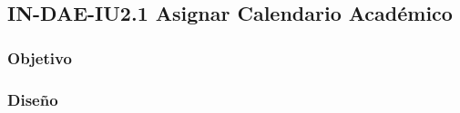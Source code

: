 \subsection{IN-DAE-IU2.1 Asignar Calendario Académico }

	\subsubsection{Objetivo}

	
\subsubsection{Diseño}

%	
%	




